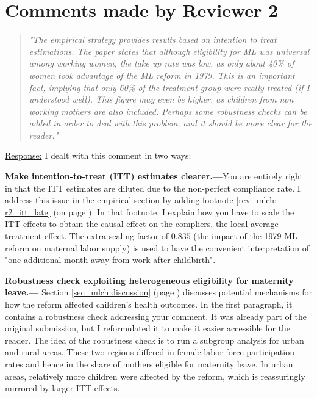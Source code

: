 
\clearpage
\section*{Comments made by Reviewer 2}


\begin{quote}
	\textit{"The empirical strategy provides results based on intention to treat estimations. The paper states that although eligibility for ML was universal among working women, the take up rate was low, as only about 40\% of women took advantage of the ML reform in 1979. This is an important fact, implying that only 60\% of the treatment group were really treated (if I understood well). This figure may even be higher, as children from non working mothers are also included. Perhaps some robustness checks can be added in order to deal with this problem, and it should be more clear for the reader."}
\end{quote}
\underline{Response:} I dealt with this comment in two ways: 

\textbf{Make intention-to-treat (ITT) estimates clearer.---}You are entirely right in that the ITT estimates are diluted due to the non-perfect compliance rate. I address this issue in the empirical section by adding footnote \ref{rev_mlch: r2_itt_late} (on page \pageref{rev_mlch: r2_itt_late}). In that footnote, I explain how you have to scale the ITT effects to obtain the causal effect on the compliers, the local average treatment effect. The extra scaling factor of $0.835$ (the impact of the 1979 ML reform on maternal labor supply) is used to have the convenient interpretation of "one additional month away from work after childbirth". 

\textbf{Robustness check exploiting heterogeneous eligibility for maternity leave.---} Section \ref{sec_mlch:discussion} (page \pageref{sec_mlch:discussion}) discusses potential mechanisms for how the reform affected children's health outcomes. In the first paragraph, it contains a robustness check addressing your comment. It was already part of the original submission, but I reformulated it to make it easier accessible for the reader. The idea of the robustness check is to run a subgroup analysis for urban and rural areas. These two regions differed in female labor force participation rates and hence in the share of mothers eligible for maternity leave. In urban areas, relatively more children were affected by the reform, which is reassuringly mirrored by larger ITT effects.





